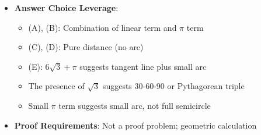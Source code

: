 \documentclass[12pt]{article}
\begin{document}
\begin{problemconfigbox}
\begin{itemize}[leftmargin=*]
    \item \textbf{Answer Choice Leverage}: 
    \begin{itemize}
        \item (A), (B): Combination of linear term and $\pi$ term
        \item (C), (D): Pure distance (no arc)
        \item (E): $6\sqrt{3} + \pi$ suggests tangent line plus small arc
        \item The presence of $\sqrt{3}$ suggests 30-60-90 or Pythagorean triple
        \item Small $\pi$ term suggests small arc, not full semicircle
    \end{itemize}
    \item \textbf{Proof Requirements}: Not a proof problem; geometric calculation
\end{itemize}


\end{problemconfigbox}
\end{document}
